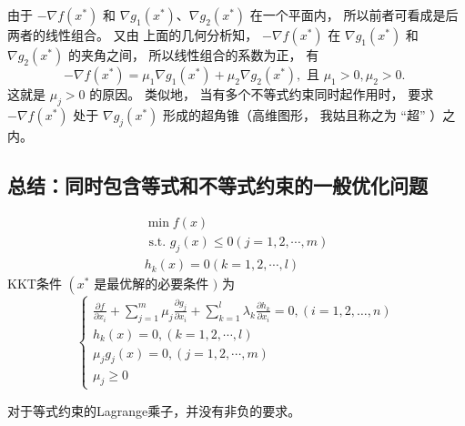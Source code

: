 由于 $ -\nabla f\left({x}^{*}\right) $ 和 $ \nabla g_{1}\left({x}^{*}\right) 、 \nabla g_{2}\left({x}^{*}\right) $ 在一个平面内， 所以前者可看成是后两者的线性组合。 又由 上面的几何分析知， $ -\nabla f\left({x}^{*}\right) $ 在 $ \nabla g_{1}\left({x}^{*}\right) $ 和 $ \nabla g_{2}\left({x}^{*}\right) $ 的夹角之间， 所以线性组合的系数为正， 有
\begin{equation}
-\nabla f\left({x}^{*}\right)=\mu_{1} \nabla g_{1}\left({x}^{*}\right)+\mu_{2} \nabla g_{2}\left({x}^{*}\right), \text { 且 } \mu_{1}>0, \mu_{2}>0 \text {. }
\end{equation}
这就是 $ \mu_{j}>0 $ 的原因。 类似地， 当有多个不等式约束同时起作用时， 要求 $ -\nabla f\left({x}^{*}\right) $ 处于 $ \nabla g_{j}\left({x}^{*}\right) $ 形成的超角锥（高维图形， 我姑且称之为 “超” ）之内。

\subsection{总结：同时包含等式和不等式约束的一般优化问题}

\begin{theorem}[同时包含等式和不等式约束的一般优化问题的KKT条件]
    \begin{equation}
\begin{array}{l}
\min f({x}) \\
\text { s.t. } g_{j}({x}) \leq 0(j=1,2, \cdots, m) \\
h_{k}({x})=0(k=1,2, \cdots, l)
\end{array}
\end{equation}
KKT条件 $ \left({x}^{*}\right. $ 是最优解的必要条件 $ ) $ 为
\begin{equation}
\left\{\begin{array}{l}
\frac{\partial f}{\partial x_{i}}+\sum_{j=1}^{m} \mu_{j} \frac{\partial g_{j}}{\partial x_{i}}+\sum_{k=1}^{l} \lambda_{k} \frac{\partial h_{k}}{\partial x_{i}}=0,(i=1,2, \ldots, n) \\
h_{k}({x})=0,(k=1,2, \cdots, l) \\
\mu_{j} g_{j}({x})=0,(j=1,2, \cdots, m) \\
\mu_{j} \geq 0
\end{array}\right.
\end{equation}
\end{theorem}

\begin{remark}
    对于等式约束的Lagrange乘子，并没有非负的要求。
\end{remark}

